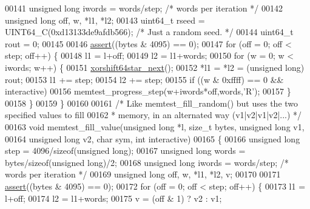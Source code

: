 \begin{DoxyCode}
{{{00141     \textcolor{keywordtype}{unsigned} \textcolor{keywordtype}{long} iwords = words/step;  \textcolor{comment}{/* words per iteration */}
00142     \textcolor{keywordtype}{unsigned} \textcolor{keywordtype}{long} off, w, *l1, *l2;
00143     uint64\_t rseed = UINT64\_C(0xd13133de9afdb566); \textcolor{comment}{/* Just a random seed. */}
00144     uint64\_t rout = 0;
00145 
00146     \hyperlink{redisassert_8h_a993abaa2c168852c1592879472938781}{assert}((bytes & 4095) == 0);
00147     \textcolor{keywordflow}{for} (off = 0; off < step; off++) \{
00148         l1 = l+off;
00149         l2 = l1+words;
00150         \textcolor{keywordflow}{for} (w = 0; w < iwords; w++) \{
00151             \hyperlink{memtest_8c_adfc09349d0ddc534c3d1702997afbab8}{xorshift64star\_next}();
00152             *l1 = *l2 = (\textcolor{keywordtype}{unsigned} \textcolor{keywordtype}{long}) rout;
00153             l1 += step;
00154             l2 += step;
00155             \textcolor{keywordflow}{if} ((w & 0xffff) == 0 && interactive)
00156                 memtest\_progress\_step(w+iwords*off,words,\textcolor{stringliteral}{'R'});
00157         \}
00158     \}
00159 \}
00160 
00161 \textcolor{comment}{/* Like memtest\_fill\_random() but uses the two specified values to fill}
00162 \textcolor{comment}{ * memory, in an alternated way (v1|v2|v1|v2|...) */}
00163 \textcolor{keywordtype}{void} memtest\_fill\_value(\textcolor{keywordtype}{unsigned} \textcolor{keywordtype}{long} *l, size\_t bytes, \textcolor{keywordtype}{unsigned} \textcolor{keywordtype}{long} v1,
00164                         \textcolor{keywordtype}{unsigned} \textcolor{keywordtype}{long} v2, \textcolor{keywordtype}{char} sym, \textcolor{keywordtype}{int} interactive)
00165 \{
00166     \textcolor{keywordtype}{unsigned} \textcolor{keywordtype}{long} step = 4096/\textcolor{keyword}{sizeof}(\textcolor{keywordtype}{unsigned} \textcolor{keywordtype}{long});
00167     \textcolor{keywordtype}{unsigned} \textcolor{keywordtype}{long} words = bytes/\textcolor{keyword}{sizeof}(\textcolor{keywordtype}{unsigned} \textcolor{keywordtype}{long})/2;
00168     \textcolor{keywordtype}{unsigned} \textcolor{keywordtype}{long} iwords = words/step;  \textcolor{comment}{/* words per iteration */}
00169     \textcolor{keywordtype}{unsigned} \textcolor{keywordtype}{long} off, w, *l1, *l2, v;
00170 
00171     \hyperlink{redisassert_8h_a993abaa2c168852c1592879472938781}{assert}((bytes & 4095) == 0);
00172     \textcolor{keywordflow}{for} (off = 0; off < step; off++) \{
00173         l1 = l+off;
00174         l2 = l1+words;
00175         v = (off & 1) ? v2 : v1;
}}}
\end{DoxyCode}
